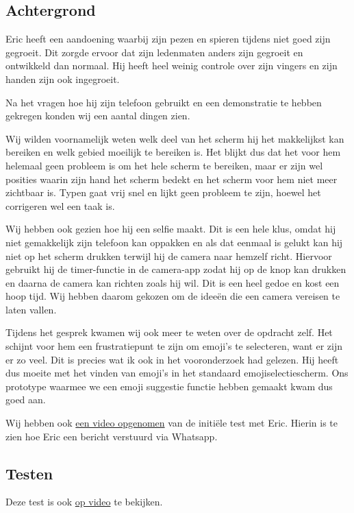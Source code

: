 \documentclass[12pt]{article}
\begin{document}
\subsection{Achtergrond}

Eric heeft een aandoening waarbij zijn pezen en spieren tijdens niet goed zijn gegroeit.
Dit zorgde ervoor dat zijn ledenmaten anders zijn gegroeit en ontwikkeld dan normaal.
Hij heeft heel weinig controle over zijn vingers en zijn handen zijn ook ingegroeit.

Na het vragen hoe hij zijn telefoon gebruikt en een demonstratie te hebben gekregen konden wij een aantal dingen zien.

Wij wilden voornamelijk weten welk deel van het scherm hij het makkelijkst kan bereiken en welk gebied moeilijk te bereiken is.
Het blijkt dus dat het voor hem helemaal geen probleem is om het hele scherm te bereiken, maar er zijn wel posities waarin zijn hand het scherm bedekt en het scherm voor hem niet meer zichtbaar is.
Typen gaat vrij snel en lijkt geen probleem te zijn, hoewel het corrigeren wel een taak is.

Wij hebben ook gezien hoe hij een selfie maakt.
Dit is een hele klus, omdat hij niet gemakkelijk zijn telefoon kan oppakken en als dat eenmaal is gelukt kan hij niet op het scherm drukken terwijl hij de camera naar hemzelf richt.
Hiervoor gebruikt hij de timer-functie in de camera-app zodat hij op de knop kan drukken en daarna de camera kan richten zoals hij wil.
Dit is een heel gedoe en kost een hoop tijd.
Wij hebben daarom gekozen om de ideeën die een camera vereisen te laten vallen.

Tijdens het gesprek kwamen wij ook meer te weten over de opdracht zelf.
Het schijnt voor hem een frustratiepunt te zijn om emoji's te selecteren, want er zijn er zo veel.
Dit is precies wat ik ook in het vooronderzoek had gelezen.
Hij heeft dus moeite met het vinden van emoji's in het standaard emojiselectiescherm.
Ons prototype waarmee we een emoji suggestie functie hebben gemaakt kwam dus goed aan.

Wij hebben ook \href{https://cdn.nicecock.eu/hcd/hcd/Attachments/initiele-test-stuur-bericht.mp4}{een video opgenomen} van de initiële test met Eric.
Hierin is te zien hoe Eric een bericht verstuurd via Whatsapp.

\subsection{Testen}

Deze test is ook \href{https://cdn.nicecock.eu/hcd/hcd/Attachments/test-not-working-ai.mp4}{op video} te bekijken. 
\end{document}

